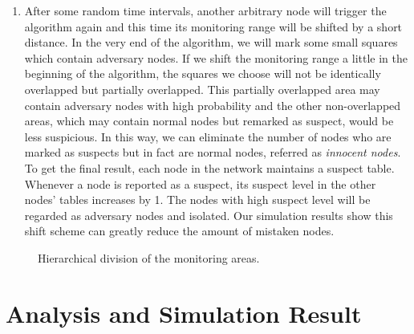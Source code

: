 \documentclass[conference]{IEEEtran}
\begin{document}
\begin{enumerate}
\item After some random time intervals, another arbitrary node will trigger the algorithm again and this time its monitoring range will be shifted by a short distance. In the very end of the algorithm, we will mark some small squares which contain adversary nodes. If we shift the monitoring range a little in the beginning of the algorithm, the squares we choose will not be identically overlapped but partially overlapped. This partially overlapped area may contain adversary nodes with high probability and the other non-overlapped areas, which may contain normal nodes but remarked as suspect,  would be less suspicious. In this way, we can eliminate the number of nodes who are marked as suspects but in fact are normal nodes, referred as \emph{innocent nodes}. To get the final result, each node in the network maintains a suspect table. Whenever a node is reported as a suspect, its suspect level in the other nodes' tables increases by 1. The nodes with high suspect level will be regarded as adversary nodes and isolated. Our simulation results show this shift scheme can greatly reduce the amount of mistaken nodes.
\end{enumerate}
\begin{figure}[!ht]
\centering
{}
\caption{\label{fig:algorithm_step}Hierarchical division of the monitoring areas.}
\end{figure}
\section{Analysis and Simulation Result}
\end{document}
